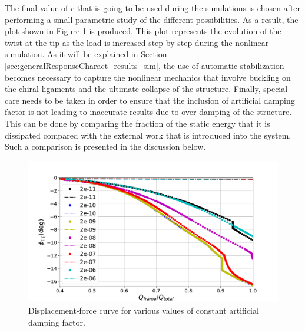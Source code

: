     The final value of $c$ that is going to be used during the simulations is chosen after performing a small parametric study of the different possibilities. As a result, the plot shown in Figure \ref{fig:forceDisplacement-damp} is produced. This plot represents the evolution of the twist at the tip as the load is increased step by step during the nonlinear simulation. As it will be explained in Section \ref{sec:generalResponseCharact_results_sim}, the use of automatic stabilization becomes necessary to capture the nonlinear mechanics that involve buckling on the chiral ligaments and the ultimate collapse of the structure. Finally, special care needs to be taken in order to ensure that the inclusion of artificial damping factor is not leading to inaccurate results due to over-damping of the structure. This can be done by comparing the fraction of the static energy that it is dissipated compared with the external work that is introduced into the system. Such a comparison is presented in the discussion below.

    \begin{figure}[!htpb]
      \centering
      \includegraphics[width=0.8 \textwidth]{figures/result-model/forceDisplacement-damp}
      \caption[Displacement-force curve for various values of constant artificial damping factor]{Displacement-force curve for various values of constant artificial damping factor.}\label{fig:forceDisplacement-damp}
    \end{figure}

